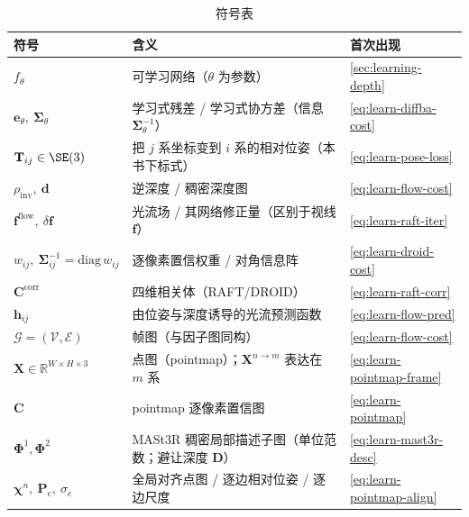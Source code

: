 \begin{table}[H]\centering\small
\caption{符号表}
\begin{tabular}{lll}
\toprule
符号 & 含义 & 首次出现 \\
\midrule
$f_\theta$ & 可学习网络（$\theta$ 为参数）& \cref{sec:learning-depth} \\
$\mathbf{e}_\theta,\ \boldsymbol\Sigma_\theta$ & 学习式残差 / 学习式协方差（信息 $\boldsymbol\Sigma_\theta^{-1}$）& \cref{eq:learn-diffba-cost} \\
$\mathbf{T}_{ij}\in\SE(3)$ & 把 $j$ 系坐标变到 $i$ 系的相对位姿（本书下标式）& \cref{eq:learn-pose-loss} \\
$\rho_{\mathrm{inv}},\ \mathbf{d}$ & 逆深度 / 稠密深度图 & \cref{eq:learn-flow-cost} \\
$\mathbf{f}^{\mathrm{flow}},\ \delta\mathbf{f}$ & 光流场 / 其网络修正量（区别于视线 $\mathbf{f}$）& \cref{eq:learn-raft-iter} \\
$w_{ij},\ \boldsymbol\Sigma_{ij}^{-1}=\mathrm{diag}\,w_{ij}$ & 逐像素置信权重 / 对角信息阵 & \cref{eq:learn-droid-cost} \\
$\mathbf{C}^{\mathrm{corr}}$ & 四维相关体（RAFT/DROID）& \cref{eq:learn-raft-corr} \\
$\mathbf{h}_{ij}$ & 由位姿与深度诱导的光流预测函数 & \cref{eq:learn-flow-pred} \\
$\mathcal{G}=(\mathcal V,\mathcal E)$ & 帧图（与因子图同构）& \cref{eq:learn-flow-cost} \\
$\mathbf{X}\in\mathbb{R}^{W\times H\times3}$ & 点图（pointmap）；$\mathbf{X}^{n\to m}$ 表达在 $m$ 系 & \cref{eq:learn-pointmap-frame} \\
$\mathbf{C}$ & pointmap 逐像素置信图 & \cref{eq:learn-pointmap} \\
$\boldsymbol\Phi^1,\boldsymbol\Phi^2$ & MASt3R 稠密局部描述子图（单位范数；避让深度 $\mathbf{D}$）& \cref{eq:learn-mast3r-desc} \\
$\boldsymbol\chi^n,\ \mathbf{P}_e,\ \sigma_e$ & 全局对齐点图 / 逐边相对位姿 / 逐边尺度 & \cref{eq:learn-pointmap-align} \\
\bottomrule
\end{tabular}
\end{table}

